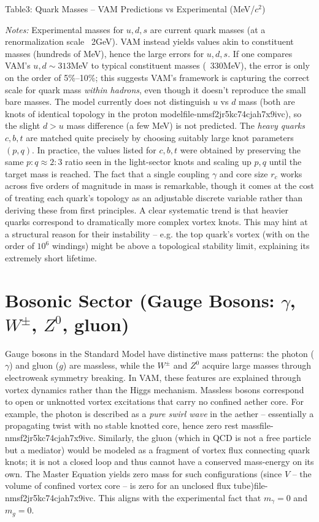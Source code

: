 Table3: Quark Masses – VAM Predictions vs Experimental (MeV/$c^2$)







\textit{Notes:} Experimental masses for $u,d,s$ are current quark masses (at a renormalization scale ~2GeV). VAM instead yields values akin to constituent masses (hundreds of MeV), hence the large errors for $u,d,s$. If one compares VAM’s $u,d\sim313$MeV to typical constituent masses (~330MeV), the error is only on the order of 5\%–10\%; this suggests VAM’s framework is capturing the correct scale for quark mass \textit{within hadrons}, even though it doesn’t reproduce the small bare masses. The model currently does not distinguish $u$ vs $d$ mass (both are knots of identical topology in the proton modelfile-nmsf2jr5kc74cjah7x9ivc), so the slight $d>u$ mass difference (a few MeV) is not predicted. The \textit{heavy quarks} $c,b,t$ are matched quite precisely by choosing suitably large knot parameters $(p,q)$. In practice, the values listed for $c,b,t$ were obtained by preserving the same $p:q \approx 2:3$ ratio seen in the light-sector knots and scaling up $p,q$ until the target mass is reached. The fact that a single coupling $\gamma$ and core size $r_c$ works across five orders of magnitude in mass is remarkable, though it comes at the cost of treating each quark’s topology as an adjustable discrete variable rather than deriving these from first principles. A clear systematic trend is that heavier quarks correspond to dramatically more complex vortex knots. This may hint at a structural reason for their instability – e.g. the top quark’s vortex (with on the order of $10^6$ windings) might be above a topological stability limit, explaining its extremely short lifetime.


\section*{Bosonic Sector (Gauge Bosons: $\gamma$, $W^\pm$, $Z^0$, gluon)}

Gauge bosons in the Standard Model have distinctive mass patterns: the photon ($\gamma$) and gluon ($g$) are massless, while the $W^\pm$ and $Z^0$ acquire large masses through electroweak symmetry breaking. In VAM, these features are explained through vortex dynamics rather than the Higgs mechanism. Massless bosons correspond to open or unknotted vortex excitations that carry no confined aether core. For example, the photon is described as a \textit{pure swirl wave} in the aether – essentially a propagating twist with no stable knotted core, hence zero rest massfile-nmsf2jr5kc74cjah7x9ivc. Similarly, the gluon (which in QCD is not a free particle but a mediator) would be modeled as a fragment of vortex flux connecting quark knots; it is not a closed loop and thus cannot have a conserved mass-energy on its own. The Master Equation yields zero mass for such configurations (since $V$ – the volume of confined vortex core – is zero for an unclosed flux tube)file-nmsf2jr5kc74cjah7x9ivc. This aligns with the experimental fact that $m_\gamma = 0$ and $m_g = 0$.


